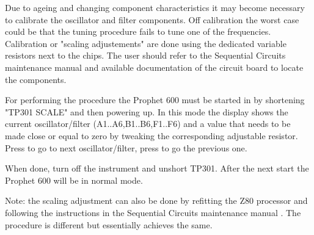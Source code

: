 Due to ageing and changing component characteristics it may become necessary to calibrate the oscillator and filter components. Off calibration the worst case could be that the tuning procedure fails to tune one of the frequencies. Calibration or "scaling adjustements" are done using the dedicated variable resistors next to the chips. The user should refer to the Sequential Circuits maintenance manual \cite{p600siservicemanual} and available documentation of the circuit board to locate the components. 

For performing the procedure the Prophet 600 must be started in \maintenance by shortening "TP301 SCALE" and then powering up. In this mode the display shows the current oscillator/filter (A1..A6,B1..B6,F1..F6) and a value that needs to be made close or equal to zero by tweaking the corresponding adjustable resistor. Press  to go to next oscillator/filter, press  to go the previous one.

When done, turn off the instrument and unshort TP301. After the next start the Prophet 600 will be in normal mode.

Note: the scaling adjustment can also be done by refitting the Z80 processor and following the instructions in the Sequential Circuits maintenance manual \cite{p600siservicemanual}. The procedure is different but essentially achieves the same.
